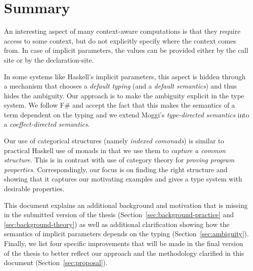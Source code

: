 \documentclass[
		twoside,openright,titlepage,numbers=noenddot,headinclude,%
                footinclude=true,cleardoublepage=empty,
                BCOR=10mm,paper=a4,fontsize=10pt, %
                ngerman,american, %
                ]{scrreprt}
\begin{document}

\section{Summary}

An interesting aspect of many context-aware computations is that they require access to some
context, but do not explicitly specify where the context comes from. In case of implicit parameters,
the values can be provided either by the call site or by the declaration-site.

In some systems like Haskell's implicit parameters, this aspect is hidden through a mechanism that
chooses a \emph{default typing} (and a \emph{default semantics}) and thus hides the ambiguity. Our approach is
to make the ambiguity explicit in the type system. We follow F\# and accept the fact that this
makes the semantics of a term dependent on the typing and we extend Moggi's \emph{type-directed
semantics} into a \emph{coeffect-directed semantics}.

Our use of categorical structures (namely \emph{indexed comonads}) is similar to practical Haskell
use of monads in that we use them to \emph{capture a common structure}. This is in contrast with
use of category theory for \emph{proving program properties}. Correspondingly, our focus is on
finding the right structure and showing that it captures our motivating examples and gives a type
system with desirable properties.

This document explains an additional background and motivation that is missing in the submitted
version of the thesis (Section~\ref{sec:background-practice} and \ref{sec:background-theory}) as
well as additional clarification showing how the semantics of implicit parameters depends on the
typing (Section~\ref{sec:ambiguity}). Finally, we list four specific improvements that will be
made in the final version of the thesis to better reflect our approach and the methodology
clarified in this document (Section~\ref{sec:proposal}).



\end{document}
